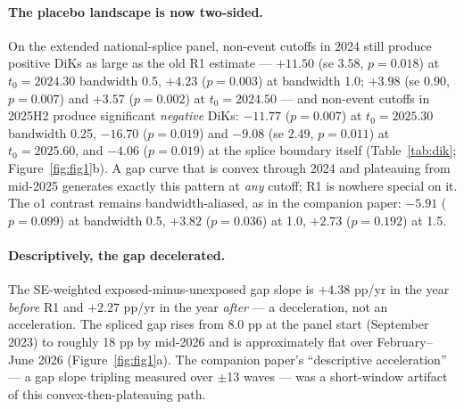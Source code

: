 \documentclass[11pt]{article}
\begin{document}
\paragraph{The placebo landscape is now two-sided.} On the extended national-splice
panel, non-event cutoffs in 2024 still produce positive DiKs as large as the
old R1 estimate --- $+11.50$ (se $3.58$, $p=0.018$) at $t_0=2024.30$
bandwidth 0.5, $+4.23$ ($p=0.003$) at bandwidth 1.0; $+3.98$ (se $0.90$,
$p=0.007$) and $+3.57$ ($p=0.002$) at $t_0=2024.50$ --- and non-event cutoffs
in 2025H2 produce significant \emph{negative} DiKs: $-11.77$ ($p=0.007$) at
$t_0=2025.30$ bandwidth 0.25, $-16.70$ ($p=0.019$) and $-9.08$ (se $2.49$,
$p=0.011$) at $t_0=2025.60$, and $-4.06$ ($p=0.019$) at the splice boundary
itself (Table~\ref{tab:dik}; Figure~\ref{fig:fig1}b). A gap curve that is
convex through 2024 and plateauing from mid-2025 generates exactly this
pattern at \emph{any} cutoff; R1 is nowhere special on it. The o1 contrast
remains bandwidth-aliased, as in the companion paper: $-5.91$ ($p=0.099$) at
bandwidth 0.5, $+3.82$ ($p=0.036$) at 1.0, $+2.73$ ($p=0.192$) at 1.5.

\paragraph{Descriptively, the gap decelerated.} The SE-weighted
exposed-minus-unexposed gap slope is $+4.38$ pp/yr in the year \emph{before}
R1 and $+2.27$ pp/yr in the year \emph{after} --- a deceleration, not an
acceleration. The spliced gap rises from 8.0 pp at the panel start
(September 2023) to roughly 18 pp by mid-2026 and is approximately flat over
February--June 2026 (Figure~\ref{fig:fig1}a). The companion paper's
``descriptive acceleration'' --- a gap slope tripling measured over $\pm$13
waves --- was a short-window artifact of this convex-then-plateauing path.
\end{document}
